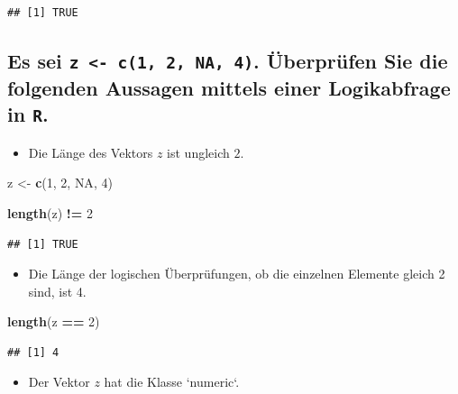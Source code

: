 \documentclass[12pt,a4paper]{article}
\newenvironment{Shaded}{\begin{snugshade}}{\end{snugshade}}
\newcommand{\ConstantTok}[1]{\textcolor[rgb]{0.56,0.35,0.01}{#1}}
\newcommand{\DecValTok}[1]{\textcolor[rgb]{0.00,0.00,0.81}{#1}}
\newcommand{\FunctionTok}[1]{\textcolor[rgb]{0.13,0.29,0.53}{\textbf{#1}}}
\newcommand{\NormalTok}[1]{#1}
\newcommand{\OtherTok}[1]{\textcolor[rgb]{0.56,0.35,0.01}{#1}}
\newcommand{\SpecialCharTok}[1]{\textcolor[rgb]{0.81,0.36,0.00}{\textbf{#1}}}
\begin{document}
\begin{verbatim}
## [1] TRUE
\end{verbatim}

\subsection{\texorpdfstring{Es sei
\texttt{z\ \textless{}-\ c(1,\ 2,\ NA,\ 4)}. Überprüfen Sie die
folgenden Aussagen mittels einer Logikabfrage in
\texttt{R}.}{Es sei z \textless- c(1, 2, NA, 4). Überprüfen Sie die folgenden Aussagen mittels einer Logikabfrage in R.}}\label{es-sei-z---c1-2-na-4.-uxfcberpruxfcfen-sie-die-folgenden-aussagen-mittels-einer-logikabfrage-in-r.}

\begin{itemize}
  \item Die Länge des Vektors $z$ ist ungleich $2$.
\end{itemize}

\begin{Shaded}
\begin{Highlighting}[]
\NormalTok{    z }\OtherTok{\textless{}{-}} \FunctionTok{c}\NormalTok{(}\DecValTok{1}\NormalTok{, }\DecValTok{2}\NormalTok{, }\ConstantTok{NA}\NormalTok{, }\DecValTok{4}\NormalTok{)}
    
    \FunctionTok{length}\NormalTok{(z) }\SpecialCharTok{!=} \DecValTok{2}
\end{Highlighting}
\end{Shaded}

\begin{verbatim}
## [1] TRUE
\end{verbatim}

\begin{itemize}
  \item Die Länge der logischen Überprüfungen, ob die einzelnen Elemente gleich 2 sind, ist 4.
\end{itemize}

\begin{Shaded}
\begin{Highlighting}[]
    \FunctionTok{length}\NormalTok{(z }\SpecialCharTok{==} \DecValTok{2}\NormalTok{)}
\end{Highlighting}
\end{Shaded}

\begin{verbatim}
## [1] 4
\end{verbatim}

\begin{itemize}
  \item Der Vektor $z$ hat die Klasse `numeric`.
\end{itemize}
\end{document}
